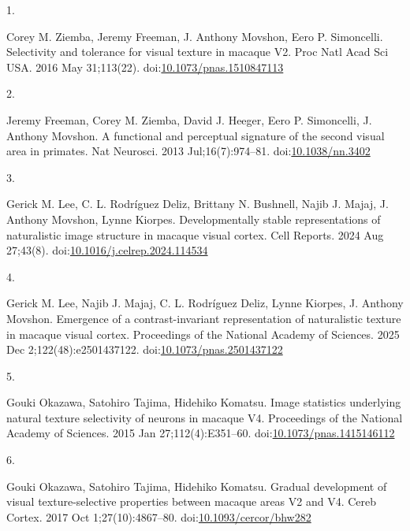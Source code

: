 \documentclass[
  11pt,
  letterpaper,
  DIV=11,
  numbers=noendperiod]{scrartcl}
\newlength{\cslhangindent}
\newlength{\csllabelwidth}
\newenvironment{CSLReferences}[2] %
 {\begin{list}{}{%
  \setlength{\itemindent}{0pt}
  \setlength{\leftmargin}{0pt}
  \setlength{\parsep}{0pt}
  \ifodd #1
   \setlength{\leftmargin}{\cslhangindent}
   \setlength{\itemindent}{-1\cslhangindent}
  \fi
  \setlength{\itemsep}{#2\baselineskip}}}
 {\end{list}}
\newcommand{\CSLLeftMargin}[1]{\parbox[t]{\csllabelwidth}{\strut#1\strut}}
\newcommand{\CSLRightInline}[1]{\parbox[t]{\linewidth - \csllabelwidth}{\strut#1\strut}}
\begin{document}
\label{refs}
\begin{CSLReferences}{0}{1}
\CSLLeftMargin{1. }%
\CSLRightInline{Corey M. Ziemba, Jeremy Freeman, J. Anthony Movshon,
Eero P. Simoncelli. Selectivity and tolerance for visual texture in
macaque V2. Proc Natl Acad Sci USA. 2016 May 31;113(22).
doi:\href{https://doi.org/10.1073/pnas.1510847113}{10.1073/pnas.1510847113}}

\CSLLeftMargin{2. }%
\CSLRightInline{Jeremy Freeman, Corey M. Ziemba, David J. Heeger, Eero
P. Simoncelli, J. Anthony Movshon. A functional and perceptual signature
of the second visual area in primates. Nat Neurosci. 2013
Jul;16(7):974--81.
doi:\href{https://doi.org/10.1038/nn.3402}{10.1038/nn.3402}}

\CSLLeftMargin{3. }%
\CSLRightInline{Gerick M. Lee, C. L. Rodríguez Deliz, Brittany N.
Bushnell, Najib J. Majaj, J. Anthony Movshon, Lynne Kiorpes.
Developmentally stable representations of naturalistic image structure
in macaque visual cortex. Cell Reports. 2024 Aug 27;43(8).
doi:\href{https://doi.org/10.1016/j.celrep.2024.114534}{10.1016/j.celrep.2024.114534}}

\CSLLeftMargin{4. }%
\CSLRightInline{Gerick M. Lee, Najib J. Majaj, C. L. Rodríguez Deliz,
Lynne Kiorpes, J. Anthony Movshon. Emergence of a contrast-invariant
representation of naturalistic texture in macaque visual cortex.
Proceedings of the National Academy of Sciences. 2025 Dec
2;122(48):e2501437122.
doi:\href{https://doi.org/10.1073/pnas.2501437122}{10.1073/pnas.2501437122}}

\CSLLeftMargin{5. }%
\CSLRightInline{Gouki Okazawa, Satohiro Tajima, Hidehiko Komatsu. Image
statistics underlying natural texture selectivity of neurons in macaque
V4. Proceedings of the National Academy of Sciences. 2015 Jan
27;112(4):E351--60.
doi:\href{https://doi.org/10.1073/pnas.1415146112}{10.1073/pnas.1415146112}}

\CSLLeftMargin{6. }%
\CSLRightInline{Gouki Okazawa, Satohiro Tajima, Hidehiko Komatsu.
Gradual development of visual texture-selective properties between
macaque areas V2 and V4. Cereb Cortex. 2017 Oct 1;27(10):4867--80.
doi:\href{https://doi.org/10.1093/cercor/bhw282}{10.1093/cercor/bhw282}}

\end{CSLReferences}
\end{document}
